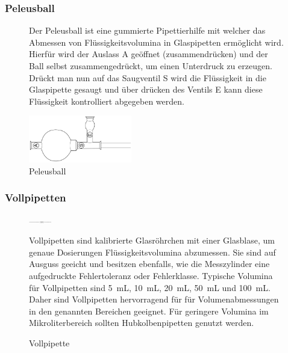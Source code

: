 \subsubsection*{Peleusball}
\begin{figure}[h!]
	\begin{minipage}[t]{0.73\textwidth}
		\vspace{0pt}
		Der Peleusball ist eine gummierte Pipettierhilfe mit welcher das Abmessen von Flüssigkeitsvolumina in Glaspipetten ermöglicht wird. Hierfür wird der Auslass A geöffnet (zusammendrücken) und der Ball selbst zusammengedrückt, um einen Unterdruck zu erzeugen. Drückt man nun auf das Saugventil S wird die Flüssigkeit in die Glaspipette gesaugt und über drücken des Ventils E kann diese Flüssigkeit kontrolliert abgegeben werden.
	\end{minipage}
	\hfill
	\begin{minipage}[t]{0.25\textwidth}
		\vspace{0pt}
		\centering
		\includegraphics[angle=90,width=0.4\textwidth]{img/peleusball}
		\caption{Peleusball}
		\label{fig:peleus}
	\end{minipage}
\end{figure}
\FloatBarrier

\subsubsection*{Vollpipetten}

\begin{figure}[h!]
	\begin{minipage}[t]{0.25\textwidth}
		\vspace{0pt}
		\centering
		\includegraphics[angle=90,width=0.088\textwidth]{img/vollpipette}
		\caption{Vollpipette}
		\label{fig:vollpipette}
	\end{minipage}
	\hfill
	\hspace{1mm}
	\begin{minipage}[t]{0.75\textwidth}
		\vspace{0pt}
		Vollpipetten sind kalibrierte Glasröhrchen mit einer Glasblase, um genaue Dosierungen Flüssigkeitsvolumina abzumessen.  Sie sind auf Ausguss geeicht und besitzen ebenfalls, wie die Messzylinder eine aufgedruckte Fehlertoleranz oder Fehlerklasse. Typische Volumina für Vollpipetten sind \SI{5}{\milli \liter}, \SI{10}{\milli \liter}, \SI{20}{\milli \liter }, \SI{50}{\milli \liter } und \SI{100}{\milli \liter}. Daher sind Vollpipetten hervorragend für für Volumenabmessungen in den genannten Bereichen geeignet. Für geringere Volumina im Mikroliterbereich sollten Hubkolbenpipetten genutzt werden.
	\end{minipage}
\end{figure}
\FloatBarrier

